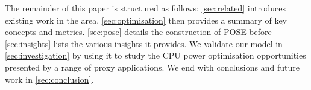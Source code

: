 The remainder of this paper is structured as follows: \autoref{sec:related} introduces existing work in the area. 
\autoref{sec:optimisation} then provides a summary of key concepts and metrics.
\autoref{sec:pose} details the construction of POSE before \autoref{sec:insights} lists the various insights it provides.
We validate our model in \autoref{sec:investigation} by using it to study the CPU power optimisation opportunities presented by a range of proxy applications. 
We end with conclusions and future work in \autoref{sec:conclusion}.
